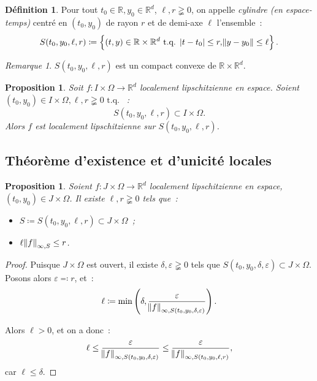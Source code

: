 \documentclass{report}
\newtheorem{prp}[thm]{Proposition}
\theoremstyle{definition}
\newtheorem{déf}[thm]{Définition}
\theoremstyle{remark}
\newtheorem*{rmq}{Remarque}
\numberwithin{equation}{section}
\newcommand{\R}{\mathbb R}
\newcommand{\tq}{\text{ t.q. }}
\begin{document}
			\begin{déf} Pour tout $t_0 \in \R, y_0 \in \R^d$, $\ell, r \gneqq 0$, on appelle \textit{cylindre (en espace-temps)} centré en $(t_0, y_0)$ de rayon
			$r$ et de demi-axe $\ell$ l'ensemble~:
			\begin{equation}
				S(t_0, y_0, \ell, r) \coloneqq \left\{(t, y) \in \R \times \R^d \tq \abs {t-t_0} \leq r, \norm {y-y_0} \leq \ell\right\}.
			\end{equation}
			\end{déf}

			\begin{rmq} $S(t_0, y_0, \ell, r)$ est un compact convexe de $\R \times \R^d$.
			\end{rmq}

			\begin{prp} Soit $f : I \times \Omega \to \R^d$ localement lipschitzienne en espace. Soient $(t_0, y_0) \in I \times \Omega, \ell, r \gneqq 0 \tq$~:
			\begin{equation}
				S(t_0, y_0, \ell, r) \subset I \times \Omega.
			\end{equation}
			Alors $f$ est localement lipschitzienne sur $S(t_0, y_0, \ell, r)$.
			\end{prp}

		\subsection{Théorème d'existence et d'unicité locales}
			\begin{prp} Soient $f : J \times \Omega \to \R^d$ localement lipschitzienne en espace, $(t_0, y_0) \in J \times \Omega$. Il existe $\ell, r \gneqq 0$
			tels que~:
			\begin{itemize}
				\item[$(i)$]  $S \coloneqq S(t_0, y_0, \ell, r) \subset J \times \Omega$~;
				\item[$(ii)$] $\ell\norm f_{\infty, S} \leq r$.
			\end{itemize}
			\end{prp}

			\begin{proof} Puisque $J \times \Omega$ est ouvert, il existe $\delta, \varepsilon \gneqq 0$ tels que
			$S(t_0, y_0, \delta, \varepsilon) \subset J \times \Omega$. Posons alors $\varepsilon \eqqcolon r$, et~:
			\begin{equation}
				\ell \coloneqq \min\left(\delta, \frac \varepsilon{\norm f_{\infty, S(t_0, y_0, \delta, \varepsilon)}}\right).
			\end{equation}

			Alors $\ell > 0$, et on a donc~:
			\begin{equation}
				\ell \leq \frac \varepsilon{\norm f_{\infty, S(t_0, y_0, \delta, \varepsilon)}} \leq \frac \varepsilon{\norm f_{\infty, S(t_0, y_0, \ell, r)}},
			\end{equation}
			car $\ell \leq \delta$.
			\end{proof}
\end{document}
